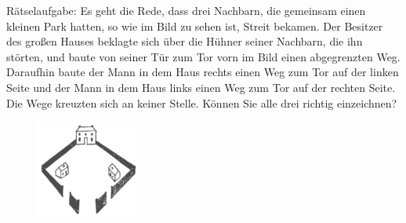 Rätselaufgabe: Es geht die Rede, dass drei Nachbarn, die gemeinsam einen kleinen Park hatten, so wie im Bild zu sehen ist, Streit bekamen. Der Besitzer des großen Hauses beklagte sich über die Hühner seiner Nachbarn, die ihn störten, und baute von seiner Tür zum Tor vorn im Bild einen abgegrenzten Weg. Daraufhin baute der Mann in dem Haus rechts einen Weg zum Tor auf der linken Seite und der Mann in dem Haus links einen Weg zum Tor auf der rechten Seite.
Die Wege kreuzten sich an keiner Stelle. Können Sie alle drei richtig einzeichnen?

\begin{figure}[ht]
	\centering
  \includegraphics[width=0.3\textwidth]{../tex-snippets/ex-graph-theory-1-img-a.png}
	\label{fig1}
\end{figure}

